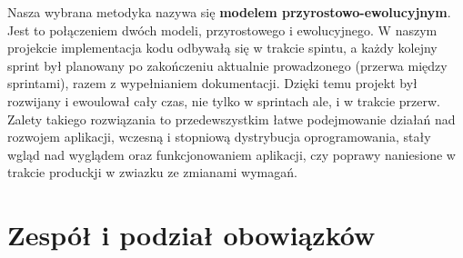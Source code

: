 \begin{chap5}
\begin{flushleft}
        \par Nasza wybrana metodyka nazywa się \textbf{modelem przyrostowo-ewolucyjnym}.
        Jest to połączeniem dwóch modeli, przyrostowego i ewolucyjnego.
        W naszym projekcie implementacja kodu odbywałą się w trakcie spintu, a każdy kolejny sprint był planowany po
        zakończeniu aktualnie prowadzonego (przerwa między sprintami), razem z wypełnianiem dokumentacji.
        Dzięki temu projekt był rozwijany i ewoulował cały czas, nie tylko w sprintach ale, i w trakcie przerw.
        Zalety takiego rozwiązania to przedewszystkim łatwe podejmowanie działań nad rozwojem aplikacji,
        wczesną i stopniową dystrybucja oprogramowania, stały wgląd nad wyglądem oraz funkcjonowaniem aplikacji,
        czy poprawy naniesione w trakcie produckji w zwiazku ze zmianami wymagań.


        \section{Zespół i podział obowiązków}




    \end{flushleft}
\end{chap5}